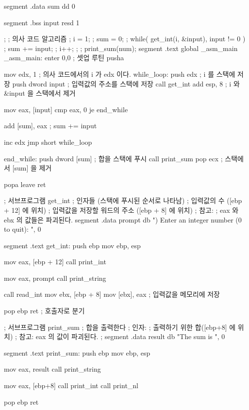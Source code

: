 
\begin{AsmCodeListing}[label=sub3.asm]

segment .data
sum     dd   0

segment .bss
input   resd 1

;
; 의사 코드 알고리즘
; i = 1;
; sum = 0;
; while( get_int(i, &input), input != 0 ) {
;   sum += input;
;   i++;
; }
; print_sum(num);
segment .text
        global  _asm_main
_asm_main:
        enter   0,0               ; 셋업 루틴
        pusha

        mov     edx, 1            ; 의사 코드에서의 i 가 edx 이다. 
while_loop:
        push    edx               ; i 를 스택에 저장 
        push    dword input       ; 입력값의 주소를 스택에 저장 %
        call    get_int
        add     esp, 8            ; i 와 &input 을 스택에서 제거 

        mov     eax, [input]
        cmp     eax, 0
        je      end_while

        add     [sum], eax        ; sum += input

        inc     edx
        jmp     short while_loop

end_while:
        push    dword [sum]       ; 합을 스택에 푸시 
        call    print_sum
        pop     ecx               ; 스택에서 [sum] 을 제거 

        popa
        leave                     
        ret

; 서브프로그램 get_int
; 인자들 (스택에 푸시된 순서로 나타남)
;   입력값의 수 ([ebp + 12] 에 위치)
;   입력값을 저장할 워드의 주소 ([ebp + 8] 에 위치)
; 참고:
;   eax 와 ebx 의 값들은 파괴된다. 
segment .data
prompt  db      ") Enter an integer number (0 to quit): ", 0

segment .text
get_int:
        push    ebp
        mov     ebp, esp

        mov     eax, [ebp + 12]
        call    print_int

        mov     eax, prompt
        call    print_string
        
        call    read_int
        mov     ebx, [ebp + 8]
        mov     [ebx], eax         ; 입력값을 메모리에 저장

        pop     ebp
        ret                        ; 호출자로 분기  

; 서브프로그램 print_sum
; 합을 출력한다 
; 인자:
;   출력하기 위한 합([ebp+8] 에 위치)
; 참고: eax 의 값이 파괴된다.
;
segment .data
result  db      "The sum is ", 0

segment .text
print_sum:
        push    ebp
        mov     ebp, esp

        mov     eax, result
        call    print_string

        mov     eax, [ebp+8]
        call    print_int
        call    print_nl

        pop     ebp
        ret
\end{AsmCodeListing}


